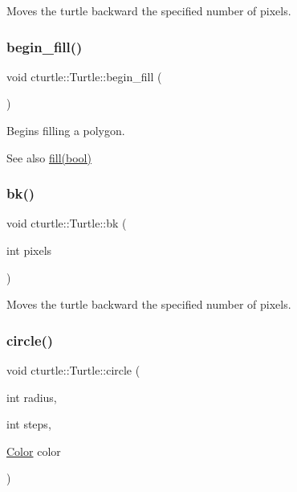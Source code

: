 Moves the turtle backward the specified number of pixels. 

\mbox{\label{classcturtle_1_1Turtle_a5d441494084c38e8947205a19f70ce73}} 
\subsubsection{\texorpdfstring{begin\+\_\+fill()}{begin\_fill()}}
{\footnotesize\ttfamily void cturtle\+::\+Turtle\+::begin\+\_\+fill (\begin{DoxyParamCaption}{ }\end{DoxyParamCaption})\hspace{0.3cm}{\ttfamily [inline]}}



Begins filling a polygon. 

\begin{DoxySeeAlso}{See also}
\hyperlink{classcturtle_1_1Turtle_a7026fc9ad563b91b5a7a168718e91d6f}{fill(bool)} 
\end{DoxySeeAlso}
\mbox{\label{classcturtle_1_1Turtle_a3f1ce4b0c550d890f8bfc7e6a02ea1ef}} 
\subsubsection{\texorpdfstring{bk()}{bk()}}
{\footnotesize\ttfamily void cturtle\+::\+Turtle\+::bk (\begin{DoxyParamCaption}\item[{int}]{pixels }\end{DoxyParamCaption})\hspace{0.3cm}{\ttfamily [inline]}}



Moves the turtle backward the specified number of pixels. 

\mbox{\label{classcturtle_1_1Turtle_a6ce4e8065581887d006f420d0e93967e}} 
\subsubsection{\texorpdfstring{circle()}{circle()}\hspace{0.1cm}{\footnotesize\ttfamily [1/2]}}
{\footnotesize\ttfamily void cturtle\+::\+Turtle\+::circle (\begin{DoxyParamCaption}\item[{int}]{radius,  }\item[{int}]{steps,  }\item[{\hyperlink{classcturtle_1_1Color}{Color}}]{color }\end{DoxyParamCaption})}



